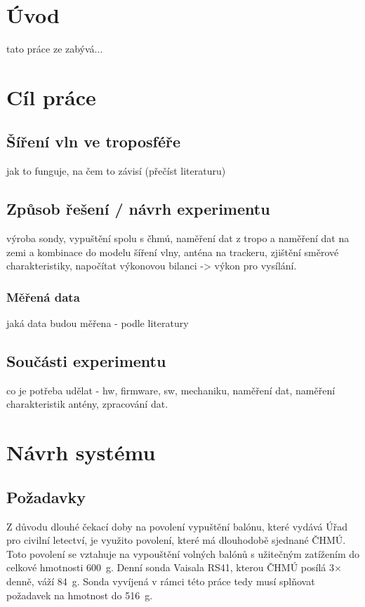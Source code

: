 \documentclass[twoside]{ctuthesis}
\theoremstyle{plain}
\theoremstyle{definition}
\theoremstyle{note}
\begin{document}
\maketitle

\chapter{Úvod}
tato práce ze zabývá...



\chapter{Cíl práce}

	\section{Šíření vln ve troposféře}
	jak to funguje, na čem to závisí (přečíst literaturu)

	\section{Způsob řešení / návrh experimentu}
	výroba sondy, vypuštění spolu s čhmú, naměření dat z tropo a naměření dat na zemi a kombinace do modelu šíření vlny, anténa na trackeru, zjištění směrové charakteristiky, napočítat výkonovou bilanci -> výkon pro vysílání.
		\subsection{Měřená data}	
		jaká data budou měřena - podle literatury

	\section{Součásti experimentu}
	co je potřeba udělat - hw, firmware, sw, mechaniku, naměření dat, naměření charakteristik antény, zpracování dat. 


\chapter{Návrh systému}

	\section{Požadavky}
	Z důvodu dlouhé čekací doby na povolení vypuštění balónu, které vydává Úřad pro civilní letectví, je využito povolení, které má dlouhodobě sjednané ČHMÚ. Toto povolení se vztahuje na vypouštění volných balónů s užitečným zatížením do celkové hmotnosti 600~g. Denní sonda Vaisala RS41, kterou ČHMÚ posílá 3$\times$ denně, váží 84~g. Sonda vyvíjená v rámci této práce tedy musí splňovat požadavek na hmotnost do 516~g.
\end{document}
